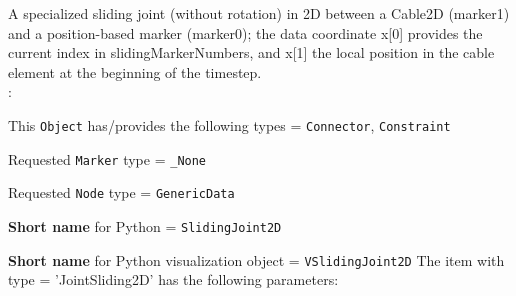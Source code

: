 %
\newpage


\label{sec:item:ObjectJointSliding2D}
A specialized sliding joint (without rotation) in 2D between a Cable2D (marker1) and a position-based marker (marker0); the data coordinate x[0] provides the current index in slidingMarkerNumbers, and x[1] the local position in the cable element at the beginning of the timestep.
\vspace{12pt}\\

\noindent {}:
\bi
  \item This \texttt{Object} has/provides the following types = \texttt{Connector}, \texttt{Constraint}
  \item Requested \texttt{Marker} type = \texttt{\_None}
  \item Requested \texttt{Node} type = \texttt{GenericData}
  \item {\bf Short name} for Python = \texttt{SlidingJoint2D}
  \item {\bf Short name} for Python visualization object = \texttt{VSlidingJoint2D}
\ei\vspace{12pt} \noindent 
The item  with type = 'JointSliding2D' has the following parameters:
\vspace{-0.5cm}\\
\vspace{-0.5cm}\\
